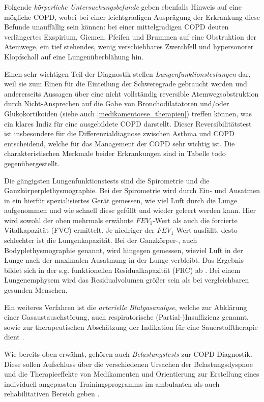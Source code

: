 Folgende \emph{körperliche Untersuchungsbefunde} geben ebenfalls Hinweis auf eine mögliche COPD, wobei bei einer leichtgradigen Ausprägung der Erkrankung diese Befunde unauffällig sein können: bei einer mittelgradigen COPD deuten verlängertes Exspirium, Giemen, Pfeifen und Brummen auf eine Obstruktion der Atemwege, ein tief stehendes, wenig verschiebbares Zwerchfell und hypersonorer Klopfschall auf eine Lungenüberblähung hin. 

Einen sehr wichtigen Teil der Diagnostik stellen \emph{Lungenfunktionstestungen} dar, weil sie zum Einen für die Einteilung der Schweregrade gebraucht werden und andererseits Aussagen über eine nicht vollständig reversible Atemwegsobstruktion durch Nicht-Ansprechen auf die Gabe von Bronchodilatatoren und/oder Glukokortikoiden (siehe auch \ref{medikamentoese_therapien}) treffen können, was ein klares Indiz für eine ausgebildete COPD darstellt. Dieser Reversibilitätstest ist insbesondere für die Differenzialdiagnose zwischen Asthma und COPD entscheidend, welche für das Management der COPD sehr wichtig ist. Die charakteristischen Merkmale beider Erkrankungen sind in Tabelle todo gegenübergestellt.

Die gängigsten Lungenfunktionstests sind die Spirometrie und die Ganzkörperplethysmographie. Bei der Spirometrie wird durch Ein- und Ausatmen in ein hierfür spezialisiertes Gerät gemessen, wie viel Luft durch die Lunge aufgenommen und wie schnell diese gefüllt und wieder geleert werden kann. Hier wird sowohl der oben mehrmals erwähnte $FEV_{1}$-Wert als auch die forcierte Vitalkapazität (FVC) ermittelt. Je niedriger der $FEV_{1}$-Wert ausfällt, desto schlechter ist die Lungenkapazität. Bei der Ganzkörper-, auch Bodyplethysmographie genannt, wird hingegen gemessen, wieviel Luft in der Lunge nach der maximalen Ausatmung in der Lunge verbleibt. Das Ergebnis bildet sich in der s.g. funktionellen Residualkapazität (FRC) ab \autocite[vgl.][e6f.]{vogelmeier2007}. Bei einem Lungenemphysem wird das Residualvolumen größer sein als bei vergleichbaren gesunden Menschen. 

Ein weiteres Verfahren ist die \emph{arterielle Blutgasanalyse}, welche zur Abklärung einer Gasaustauschstörung, auch respiratorische (Partial-)Insuffizienz genannt, sowie zur therapeutischen Abschätzung der Indikation für eine Sauerstofftherapie dient \autocite[190]{welte2007}.

Wie bereits oben erwähnt, gehören auch \emph{Belastungstests} zur COPD-Diagnostik. Diese sollen Aufschluss über die verschiedenen Ursachen der Belastungsdyspnoe und die Therapieeffekte von Medikamenten und Orientierung zur Erstellung eines individuell angepassten Trainingsprogramms im ambulanten als auch rehabilitativen Bereich geben \autocite[vgl.][e7]{vogelmeier2007}. 

